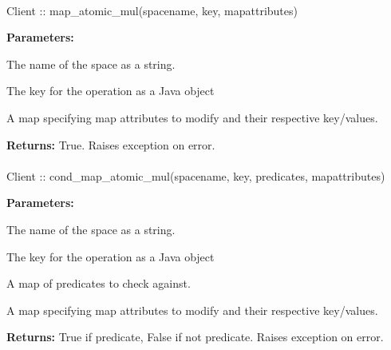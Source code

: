 \paragraph{}
\label{api:java:map_atomic_mul}
\begin{javacode}
Client :: map_atomic_mul(spacename, key, mapattributes)
\end{javacode}


\noindent\textbf{Parameters:}
\begin{description}[labelindent=\widthof{{\code{mapattributes}}},leftmargin=*,noitemsep,nolistsep,align=right]
\item[\code{spacename}] The name of the space as a string.
\item[\code{key}] The key for the operation as a Java object
\item[\code{mapattributes}] A map specifying map attributes to modify and their respective key/values.
\end{description}

\noindent\textbf{Returns:}
True.  Raises exception on error.

\paragraph{}
\label{api:java:cond_map_atomic_mul}
\begin{javacode}
Client :: cond_map_atomic_mul(spacename, key, predicates, mapattributes)
\end{javacode}


\noindent\textbf{Parameters:}
\begin{description}[labelindent=\widthof{{\code{mapattributes}}},leftmargin=*,noitemsep,nolistsep,align=right]
\item[\code{spacename}] The name of the space as a string.
\item[\code{key}] The key for the operation as a Java object
\item[\code{predicates}] A map of predicates to check against.
\item[\code{mapattributes}] A map specifying map attributes to modify and their respective key/values.
\end{description}

\noindent\textbf{Returns:}
True if predicate, False if not predicate.  Raises exception on error.

